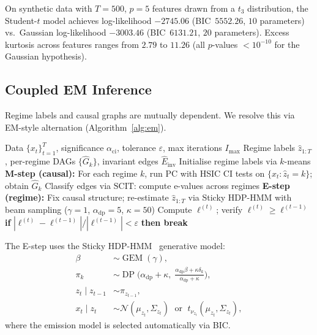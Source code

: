 \documentclass[11pt]{article}
\newcommand{\SCIT}{\text{SCIT}}
\DeclareMathOperator{\GEM}{GEM}
\DeclareMathOperator{\DP}{DP}
\begin{document}
On synthetic data with $T = 500$, $p = 5$ features drawn from a
$t_3$ distribution, the Student-$t$ model achieves log-likelihood
$-2745.06$ (BIC~$5552.26$, $10$ parameters) vs.\ Gaussian
log-likelihood $-3003.46$ (BIC~$6131.21$, $20$ parameters).
Excess kurtosis across features ranges from $2.79$ to $11.26$
(all $p$-values $< 10^{-10}$ for the Gaussian hypothesis).

\subsection{Coupled EM Inference}\label{sec:coupled}

Regime labels and causal graphs are mutually dependent.  We resolve
this via EM-style alternation (Algorithm~\ref{alg:em}).

\begin{algorithm}[t]
\caption{Coupled Regime-Causal EM}\label{alg:em}
\begin{algorithmic}[1]
\Require Data $\{x_t\}_{t=1}^T$, significance $\alpha_{\mathrm{ci}}$,
  tolerance $\varepsilon$, max iterations $I_{\max}$
\Ensure Regime labels $\hat{z}_{1:T}$, per-regime DAGs
  $\{\hat{G}_k\}$, invariant edges $\hat{E}_{\mathrm{inv}}$
\State Initialise regime labels via $k$-means
  \State \textbf{M-step (causal):} For each regime $k$, run PC with
         HSIC CI tests on $\{x_t : \hat{z}_t = k\}$; obtain
         $\hat{G}_k$
  \State Classify edges via $\SCIT$: compute e-values across regimes
  \State \textbf{E-step (regime):} Fix causal structure; re-estimate
         $\hat{z}_{1:T}$ via Sticky HDP-HMM with beam sampling
         ($\gamma{=}1$, $\alpha_{\mathrm{dp}}{=}5$, $\kappa{=}50$)
  \State Compute $\ell^{(t)}$; verify $\ell^{(t)} \geq \ell^{(t-1)}$
  \State \textbf{if} $|\ell^{(t)} - \ell^{(t-1)}|/|\ell^{(t-1)}|
         < \varepsilon$ \textbf{then break}
\EndFor
\end{algorithmic}
\end{algorithm}

The E-step uses the Sticky HDP-HMM~\cite{fox2011sticky} generative model:
\begin{align}
  \beta &\sim \GEM(\gamma), \label{eq:hdp1}\\
  \pi_k &\sim \DP\!\bigl(\alpha_{\mathrm{dp}} + \kappa,\;
    \tfrac{\alpha_{\mathrm{dp}}\beta + \kappa\delta_k}
    {\alpha_{\mathrm{dp}} + \kappa}\bigr), \label{eq:hdp2}\\
  z_t \mid z_{t-1} &\sim \pi_{z_{t-1}}, \label{eq:hdp3}\\
  x_t \mid z_t &\sim \mathcal{N}(\mu_{z_t}, \Sigma_{z_t})
  \;\text{ or }\; t_{\nu_{z_t}}(\mu_{z_t}, \Sigma_{z_t}),
    \label{eq:hdp4}
\end{align}
where the emission model is selected automatically via BIC.
\end{document}
